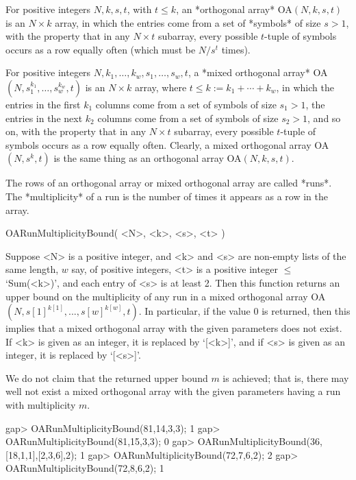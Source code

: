 
For positive integers $N,k,s,t$, with $t\le k$, an *orthogonal array*
OA$(N,k,s,t)$ is an $N\times k$ array, in which the entries come from a
set of *symbols* of size $s>1$, with the property that in any $N\times t$
subarray, every possible $t$-tuple of symbols occurs as a row equally
often (which must be $N/s^t$ times).

For positive integers $N,k_1,\ldots,k_w,s_1,\ldots,s_w,t$, a *mixed
orthogonal array* 
OA$(N,s_1^{k_1},\ldots,s_w^{k_w},t)$ is an $N\times k$
array, where $t\le k:=k_1+\cdots +k_w$, in which the entries in the first
$k_1$ columns come from a set of symbols of size $s_1>1$, the entries
in the next $k_2$ columns come from a set of symbols of size $s_2>1$,
and so on, with the property that in any $N\times t$ subarray, every
possible $t$-tuple of symbols occurs as a row equally often.
Clearly, a mixed orthogonal array OA$(N,s^k,t)$ is the same thing as an
orthogonal array OA$(N,k,s,t)$.  

The rows of an orthogonal array or mixed orthogonal array are called *runs*. 
The *multiplicity* of a run is the number of times it appears as a row
in the array.


\>OARunMultiplicityBound( <N>, <k>, <s>, <t> )

Suppose <N> is a positive integer, and <k> and <s> are non-empty lists
of the same length, $w$ say, of positive integers, <t> is a positive
integer $\le$ `Sum(<k>)', and each entry of <s> is at least 2.
Then this function returns an upper bound on the multiplicity of any
run in a mixed orthogonal array 
OA$(N,s[1]^{k[1]},...,s[w]^{k[w]},t)$.
In particular, if the value $0$ is returned, then this implies that a
mixed orthogonal array with the given parameters does not exist.
If <k> is given as an integer, it is replaced by `[<k>]', and
if <s> is given as an integer, it is replaced by `[<s>]'.

We do not claim that the returned upper bound $m$ is achieved; that
is, there may well not exist a mixed orthogonal array with the given
parameters having a run with multiplicity $m$.

\beginexample
gap> OARunMultiplicityBound(81,14,3,3);
1
gap> OARunMultiplicityBound(81,15,3,3);
0
gap> OARunMultiplicityBound(36,[18,1,1],[2,3,6],2);
1
gap> OARunMultiplicityBound(72,7,6,2);
2
gap> OARunMultiplicityBound(72,8,6,2);
1
\endexample


